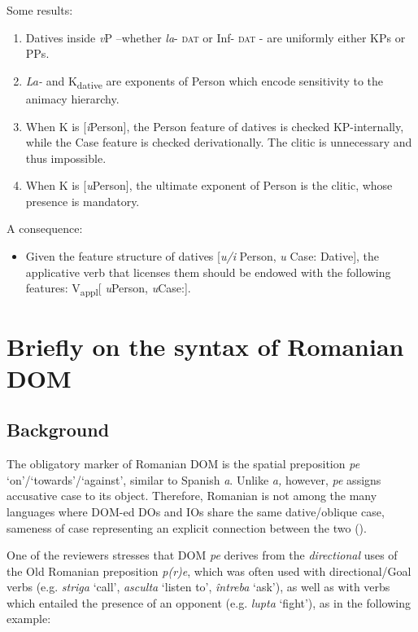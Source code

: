 \documentclass[output=paper,colorlinks,citecolor=brown,nonflat]{langsci/langscibook}
\begin{document}
 {Some} {results}:
\begin{enumerate}
	\item Datives inside \textit{v}P –whether \textit{la}{}- \textsc{dat} or Inf- \textsc{dat} - are uniformly either KPs or PPs.
	\item \textit{La-} and K\textsubscript{dative} are exponents of Person which encode sensitivity to the animacy hierarchy.
	\item When K is [\textit{i}Person], the Person feature of datives is checked KP-internally, while the Case feature is checked derivationally. The clitic is unnecessary and thus impossible.
	\item When K is [\textit{u}Person], the ultimate exponent of Person is the clitic, whose presence is mandatory.
\end{enumerate}

 A consequence:
 \begin{itemize}
	\item Given the feature structure of datives [\textit{u/i} Person, \textit{u} Case: Dative], the applicative verb that licenses them should be endowed with the following features: V\textsubscript{appl}[ \textit{u}Person, \textit{u}Case:{\longrule}].
\end{itemize}

\section{Briefly on the syntax of Romanian DOM} %

\subsection{{Background}}

The obligatory marker of Romanian DOM is the spatial preposition \textit{pe} ‘on’/‘to\-wards’/‘against’, similar to Spanish \textit{a}. Unlike \textit{a,} however, \textit{pe} assigns accusative case to its object. Therefore, Romanian is not among the many languages where DOM-ed DOs and IOs share the same dative/oblique case, sameness of case representing an explicit connection between the two (\citealt{ManziniFranco2016}).

One of the reviewers stresses that DOM \textit{pe} derives from the \textit{directional} uses of the Old Romanian preposition \textit{p(r)e}, which was often used with directional/Goal verbs (e.g. \textit{striga} ‘call’, \textit{asculta} ‘listen to’, \textit{întreba} ‘ask’), as well as with verbs which entailed the presence of an opponent (e.g. \textit{lupta} ‘fight’), as in the following example:
\end{document}

